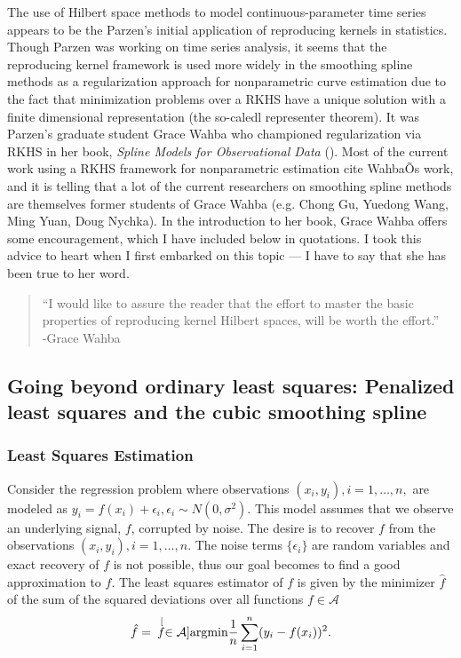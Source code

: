 The use of Hilbert space methods to model continuous-parameter time series appears to be the Parzen's initial application of reproducing kernels in statistics. Though Parzen was working on time series analysis, it seems that the reproducing kernel framework is used more widely in the smoothing spline methods as a regularization approach for nonparametric curve estimation due to the fact that minimization problems over a RKHS have a unique solution with a finite dimensional representation (the so-caledl representer theorem). It was Parzen's graduate student Grace Wahba who championed regularization via RKHS in her book, \emph{Spline Models for Observational Data} (\cite{Wahba:1990}). Most of the current work using a RKHS framework for nonparametric estimation cite WahbaÕs work, and it is telling that a lot of the current researchers on smoothing spline methods are themselves former students of Grace Wahba (e.g. Chong Gu, Yuedong Wang, Ming Yuan, Doug Nychka). In the introduction to her book, Grace Wahba offers some encouragement, which I have included below in quotations. I took this advice to heart when I first embarked on this topic --- I have to say that she has been true to her word. 
\begin{quote}
``I would like to assure the reader that the effort to master the basic properties of reproducing kernel Hilbert spaces, will be worth the effort.''\\
-Grace Wahba
\end{quote}

\subsection{ Going beyond ordinary least squares: Penalized least squares and the cubic smoothing spline} 


\subsubsection{Least Squares Estimation}
Consider the regression problem where observations $(x_i, y_i), i=1,\dots,n,$ are modeled as $y_i = f(x_i) + \epsilon_i, \epsilon_i \sim N(0,\sigma^2).$ This model assumes that we observe an underlying signal, $f$, corrupted by noise. The desire is to recover $f$ from the observations $(x_i, y_i), i=1,\dots,n$. The noise terms $\{\epsilon_i\}$ are random variables and exact recovery of $f$ is not possible, thus our goal becomes to find a good approximation to $f$. The least squares estimator of $f$ is given by the minimizer $\hat{f}$ of the sum of the squared deviations over all functions $f \in \mathcal{A}$ 
\begin{equation*}
\hat{f} = \hspace{.07in} \stackrel[f \in \mathcal{A}]{}{\mbox{argmin}} \frac{1}{n}\sum_{i=1}^{n}(y_i - f(x_i))^2.
\label{eq:LS}
\end{equation*}

